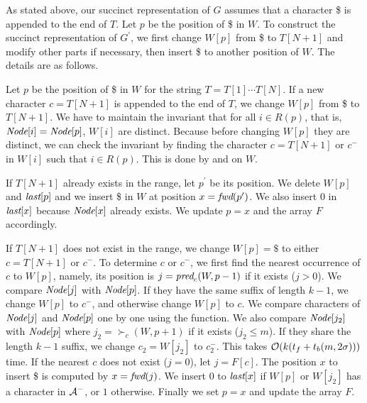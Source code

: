 As stated above, our succinct representation of $G$ assumes that a character \$ is appended
to the end of $T$.  Let $p$ be the position of \$ in $W$.
To construct the succinct representation of $G^\prime$,
we first change $W[p]$ from \$ to $T[N+1]$ and modify other parts if necessary,
then insert \$ to another position of $W$.  The details are as follows.

Let $p$ be the position of \$ in $W$ for the string $T = T[1] \cdots T[N]$.
If a new character $c = T[N+1]$ is appended to the end of $T$, we change $W[p]$ from \$ to $T[N+1]$.
We have to maintain the invariant that for all $i \in R(p)$, that is, ${\textit{Node}}[i] = {\textit{Node}}[p]$,
$W[i]$ are distinct.
Because before changing $W[p]$ they are distinct, we can check the invariant by finding the character
$c = T[N+1]$ or $c^-$ in $W[i]$ such that $i \in R(p)$.  This is done by {\rank} and {\select} on $W$.

If $T[N+1]$ already exists in the range, let $p^\prime$ be its position.
We delete $W[p]$ and ${\textit{last}}[p]$ and we insert \$ in $W$ at position $x = {\textit{fwd}}(p^\prime)$.
We also insert $0$ in ${\textit{last}}[x]$ because ${\textit{Node}}[x]$ already exists.
We update $p = x$ and the array $F$ accordingly.

If $T[N+1]$ does not exist in the range,
we change $W[p] = \$ $ to either $c = T[N+1]$ or $c^-$.
To determine $c$ or $c^-$, we first find the nearest occurrence of $c$ to $W[p]$,
namely, its position is $j = {\textit{pred}}_c(W, p-1)$ if it exists ($j > 0$).
We compare ${\textit{Node}}[j]$ with ${\textit{Node}}[p]$.  If they have the same suffix of length $k-1$,
we change $W[p]$ to $c^-$, and otherwise change $W[p]$ to $c$.
We compare characters of ${\textit{Node}}[j]$ and ${\textit{Node}}[p]$ one by one using the {\bwd} function.
We also compare ${\textit{Node}}[j_2]$ with ${\textit{Node}}[p]$ where
$j_2 = {\succ}_c(W, p+1)$ if it exists ($j_2 \le m$).
If they share the length $k-1$ suffix, we change $c_2 = W[j_2]$ to $c_2^-$.
This takes $\mathcal{O}(k(t_f + t_b(m,2\sigma)))$ time.
If the nearest $c$ does not exist ($j = 0$), let $j = F[c]$.
The position $x$ to insert \$ is computed by $x = {\textit{fwd}}(j)$.
We insert $0$ to ${\textit{last}}[x]$ if $W[p]$ or $W[j_2]$ has a character in ${\cal A}^-$,
or $1$ otherwise.  Finally we set $p = x$ and update the array $F$.

